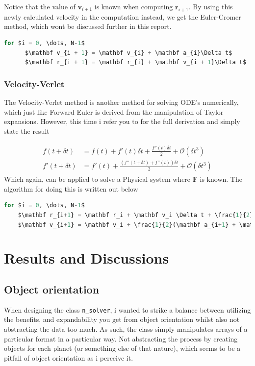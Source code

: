 \documentclass[10pt,showpacs,preprintnumbers,footinbib,amsmath,amssymb,aps,prl,twocolumn,groupedaddress,superscriptaddress,showkeys]{revtex4-1}
\begin{document}
  Notice that the value of $\mathbf v_{i+1}$ is known when computing $\mathbf r_{i+1}$. By using this newly calculated velocity in the computation instead, we get the Euler-Cromer method, which wont be discussed further in this report.

  \begin{lstlisting}[mathescape=true, language=python, title=Euler-Cromer Algorithm]
  for $i = 0, \dots, N-1$
      $\mathbf v_{i + 1} = \mathbf v_{i} + \mathbf a_{i}\Delta t$
      $\mathbf r_{i + 1} = \mathbf r_{i} + \mathbf v_{i + 1}\Delta t$
  \end{lstlisting}

  \subsubsection{Velocity-Verlet}
    The Velocity-Verlet method is another method for solving ODE's numerically, which just like Forward Euler is derived from the manipulation of Taylor expansions. However, this time i refer you to \cite{ode_lecture} for the full derivation and simply state the result

    \begin{align}
      \begin{split}
        f(t + \delta t) &= f(t) + f'(t)\delta t + \frac{f''(t)\delta t}{2} + \mathcal O(\delta t^3) \\
        f'(t + \delta t) &= f'(t) + \frac{\left( f''(t + \delta t) + f''(t) \right)\delta t}{2} + \mathcal O(\delta t^3)
      \end{split}
    \end{align}
    Which again, can be applied to solve a Physical system where $\mathbf F$ is known. The algorithm for doing this is written out below
  \begin{lstlisting}[mathescape=true, language=python, title=Velocity-Verlet Algorithm]
  for $i = 0, \dots, N-1$
    $\mathbf r_{i+1} = \mathbf r_i + \mathbf v_i \Delta t + \frac{1}{2}\mathbf a_i(\Delta t)^2$
    $\mathbf v_{i+1} = \mathbf v_i + \frac{1}{2}(\mathbf a_{i+1} + \mathbf a_i)\Delta t  $
  \end{lstlisting}



\section{Results and Discussions}
  \subsection{Object orientation}
    When designing the class \lstinline{n_solver}, i wanted to strike a balance between utilizing the benefits, and expandability you get from object orientation whilst also not abstracting the data too much. As such, the class simply manipulates arrays of a particular format in a particular way. Not abstracting the process by creating objects for each planet (or something else of that nature), which seems to be a pitfall of object orientation as i perceive it.
\end{document}
